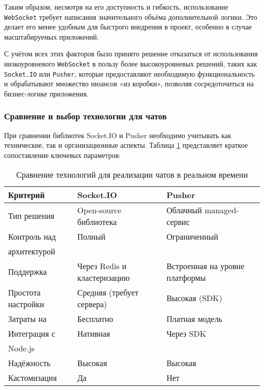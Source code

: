 Таким образом, несмотря на его доступность и гибкость, использование \texttt{WebSocket} требует написания значительного объёма дополнительной логики. Это делает его менее удобным для быстрого внедрения в проект, особенно в случае масштабируемых приложений.

С учётом всех этих факторов было принято решение отказаться от использования низкоуровневого \texttt{WebSocket} в пользу более высокоуровневых решений, таких как \texttt{Socket.IO} или \texttt{Pusher}, которые предоставляют необходимую функциональность и обрабатывают множество нюансов «из коробки», позволяя сосредоточиться на бизнес-логике приложения.


\subsubsection*{Сравнение и выбор технологии для чатов}

При сравнении библиотек Socket.IO и Pusher необходимо учитывать как технические, так и организационные аспекты. Таблица \ref{tab:chat-comparison} представляет краткое сопоставление ключевых параметров:

\begin{table}[h]
  \centering
  \caption{Сравнение технологий для реализации чатов в реальном времени}
  \small
  \label{tab:chat-comparison}
  \begin{tabular}{|l|p{5cm}|p{5cm}|}
    \hline
    \textbf{Критерий} & \textbf{Socket.IO}               & \textbf{Pusher}                 \\ \hline
    Тип решения      & Open-source библиотека           & Облачный managed-сервис         \\ \hline
    Контроль над     & Полный                           & Ограниченный                    \\ 
    архитектурой     &                                  &                                 \\ \hline
    Поддержка        & Через Redis и кластеризацию      & Встроенная на уровне платформы  \\ \hline
    Простота настройки & Средняя (требует сервера)      & Высокая (SDK)                   \\ \hline
    Затраты на       & Бесплатно                        & Платная модель                  \\ \hline
    Интеграция с     & Нативная                         & Через SDK                       \\ 
    Node.js          &                                  &                                 \\ \hline
    Надёжность       & Высокая                          & Высокая                         \\ \hline
    Кастомизация     & Да                               & Нет                             \\ \hline
  \end{tabular}
\end{table}

